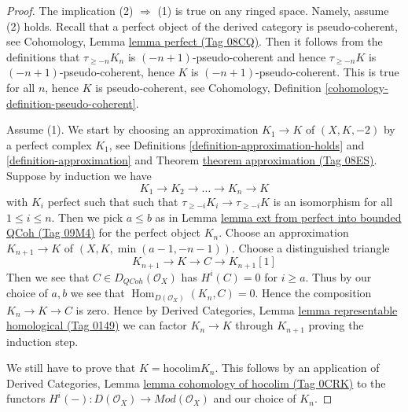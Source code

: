 \documentclass{amsart}
\theoremstyle{plain}
\theoremstyle{definition}
\theoremstyle{remark}
\numberwithin{equation}{subsection}
\def\Hom{\mathop{\mathrm{Hom}}\nolimits}
\def\QCoh{\mathit{QCoh}}
\begin{document}
\begin{proof}
The implication (2) $\Rightarrow$ (1) is true on any ringed space.
Namely, assume (2) holds. Recall that a perfect object of the derived
category is pseudo-coherent, see
Cohomology, Lemma \href{https://stacks.math.columbia.edu/tag/08CQ}{lemma perfect (Tag 08CQ)}.
Then it follows from the definitions that
$\tau_{\geq -n}K_n$ is $(-n + 1)$-pseudo-coherent
and hence $\tau_{\geq -n}K$ is $(-n + 1)$-pseudo-coherent,
hence $K$ is $(-n + 1)$-pseudo-coherent. This is true for
all $n$, hence $K$ is pseudo-coherent, see
Cohomology, Definition \ref{cohomology-definition-pseudo-coherent}.

\medskip\noindent
Assume (1). We start by choosing an approximation
$K_1 \to K$ of $(X, K, -2)$ by a perfect complex $K_1$, see
Definitions \ref{definition-approximation-holds} and
\ref{definition-approximation} and
Theorem \href{https://stacks.math.columbia.edu/tag/08ES}{theorem approximation (Tag 08ES)}.
Suppose by induction we have
$$
K_1 \to K_2 \to \ldots \to K_n \to K
$$
with $K_i$ perfect such that
such that $\tau_{\geq -i}K_i \to \tau_{\geq -i}K$ is an isomorphism
for all $1 \leq i \leq n$. Then we pick $a \leq b$ as in
Lemma \href{https://stacks.math.columbia.edu/tag/09M4}{lemma ext from perfect into bounded QCoh (Tag 09M4)}
for the perfect object $K_n$. Choose an approximation
$K_{n + 1} \to K$ of $(X, K, \min(a - 1, -n - 1))$.
Choose a distinguished triangle
$$
K_{n + 1} \to K \to C \to K_{n + 1}[1]
$$
Then we see that $C \in D_\QCoh(\mathcal{O}_X)$ has
$H^i(C) = 0$ for $i \geq a$. Thus by our choice of $a, b$
we see that $\Hom_{D(\mathcal{O}_X)}(K_n, C) = 0$.
Hence the composition $K_n \to K \to C$ is zero. Hence by
Derived Categories, Lemma \href{https://stacks.math.columbia.edu/tag/0149}{lemma representable homological (Tag 0149)}
we can factor $K_n \to K$ through $K_{n + 1}$
proving the induction step.

\medskip\noindent
We still have to prove that $K = \text{hocolim} K_n$.
This follows by an application of
Derived Categories, Lemma \href{https://stacks.math.columbia.edu/tag/0CRK}{lemma cohomology of hocolim (Tag 0CRK)}
to the functors
$H^i( - ) : D(\mathcal{O}_X) \to \textit{Mod}(\mathcal{O}_X)$
and our choice of $K_n$.
\end{proof}
\end{document}
